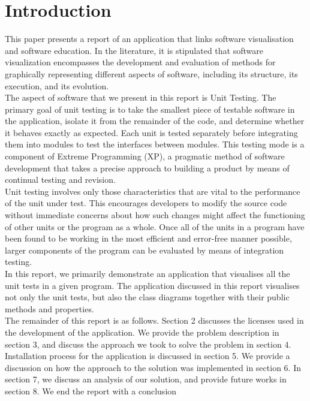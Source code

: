 \documentclass[a4paper,12pt]{Article}
\begin{document}
\section{Introduction}
This paper presents a report of an application that links software visualisation and software education. In the literature, it is stipulated that software visualization encompasses the development and evaluation of methods for graphically representing different aspects of software, including its structure, its execution, and its evolution.\\
\linebreak  
The aspect of software that we present in this report is Unit Testing\cite{unitTests}. The primary goal of unit testing is to take the smallest piece of testable software in the application, isolate it from the remainder of the code, and determine whether it behaves exactly as expected. Each unit is tested separately before integrating them into modules to test the interfaces between modules.
This testing mode is a component of Extreme Programming (XP)\cite{xp}, a pragmatic method of software development that takes a precise approach to building a product by means of continual testing and revision.\\
\linebreak  
Unit testing involves only those characteristics that are vital to the performance of the unit under test. This encourages developers to modify the source code without immediate concerns about how such changes might affect the functioning of other units or the program as a whole. Once all of the units in a program have been found to be working in the most efficient and error-free manner possible, larger components of the program can be evaluated by means of integration testing.\\
\linebreak  
In this report, we primarily demonstrate an application that visualises all the unit tests in a given program. The application discussed in this report visualises not only the unit tests, but also the class diagrams together with their public methods and properties.\\
\linebreak  
The remainder of this report is as follows. Section 2 discusses the licenses used in the development of the application. We provide the problem description in section 3, and discuss the approach we took to solve the problem in section 4. Installation process for the application is discussed in section 5. We provide a discussion on how the approach to the solution was implemented in section 6. In section 7, we discuss an analysis of our solution, and provide future works in section 8. We end the report with a conclusion
\end{document}
